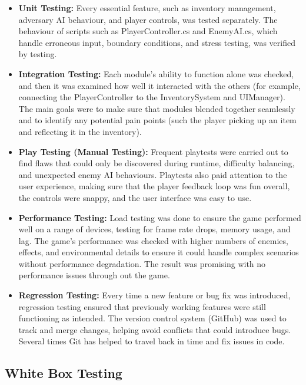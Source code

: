 \begin{itemize}
	\item \textbf{Unit Testing:}
	Every essential feature, such as inventory management, adversary AI behaviour, and player controls, was tested separately.
	The behaviour of scripts such as PlayerController.cs and EnemyAI.cs, which handle erroneous input, boundary conditions, and stress testing, was verified by testing.
	\item \textbf{Integration Testing:}
	Each module's ability to function alone was checked, and then it was examined how well it interacted with the others (for example, connecting the PlayerController to the InventorySystem and UIManager).
	The main goals were to make sure that modules blended together seamlessly and to identify any potential pain points (such the player picking up an item and reflecting it in the inventory).
	\item \textbf{Play Testing (Manual Testing):}
	Frequent playtests were carried out to find flaws that could only be discovered during runtime, difficulty balancing, and unexpected enemy AI behaviours.
	Playtests also paid attention to the user experience, making sure that the player feedback loop was fun overall, the controls were snappy, and the user interface was easy to use.
	\item \textbf{Performance Testing:}
	Load testing was done to ensure the game performed well on a range of devices, testing for frame rate drops, memory usage, and lag.
	The game’s performance was checked with higher numbers of enemies, effects, and environmental details to ensure it could handle complex scenarios without performance degradation. The result was promising with no performance issues through out the game.
	\item \textbf{Regression Testing:}
	Every time a new feature or bug fix was introduced, regression testing ensured that previously working features were still functioning as intended.
	The version control system (GitHub) was used to track and merge changes, helping avoid conflicts that could introduce bugs. Several times Git has helped to travel back in time and fix issues in code.
\end{itemize}

\subsection{White Box Testing}
